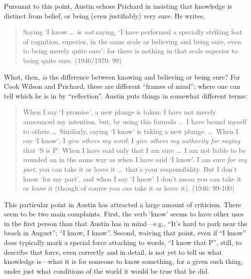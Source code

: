 Pursuant to this point, Austin echoes Prichard in insisting that knowledge is distinct from belief, or being (even justifiably) very sure. He writes,
\begin{quote}
	Saying `I know \ldots\ is \emph{not} saying, `I have performed a specially striking feat of cognition, superior, in the same scale as believing and being sure, even to being merely quite sure': for there is nothing in that scale superior to being quite sure. (1946/1970: 99)
\end{quote}
What, then, \emph{is} the difference between knowing and believing or being sure? For Cook Wilson and Prichard, these are different ``frames of mind''; where one can tell which he is in by ``reflection''. Austin puts things in somewhat different terms:
\begin{quotation}
	\noindent When I say `I promise', a new plunge is taken: I have not merely announced my intention, but, by using this formula \ldots\ I have bound myself to others \ldots\ Similarly, saying `I know' is taking a new plunge. \ldots\ When I say `I know', I \emph{give others my word}; I \emph{give others my authority for saying} that `S is P'.
	When I have said only that I am sure \ldots\ I am not liable to be rounded on in the same way as when I have said `I know'. I am sure \emph{for my part}, you can take it or leave it \ldots\ that’s your responsibility. But I don’t know `for my part', and when I say `I know' I don't mean you can take it or leave it (though of course you \emph{can} take it or leave it). (1946: 99-100)
\end{quotation}
This particular point in Austin has attracted a large amount of criticism. There seem to be two main complaints. First, the verb `know' seems to have other uses in the first person than that Austin has in mind---e.g., ``It's hard to park near the beach in August''; ``I know, I know''. Second, waiving that point, even if ``I know'' does typically mark a special force attaching to words, ``I know that P'', still, to describe that force, even correctly and in detail, is not yet to tell us what knowledge is---what it is for someone to know something, for a given such thing, under just what conditions of the world it would be true that he did.


